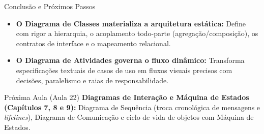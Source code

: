 \documentclass[10pt]{beamer}
\begin{document}
\begin{frame}{Conclusão e Próximos Passos}
    \begin{itemize}
        \item \textbf{O Diagrama de Classes materializa a arquitetura estática:} Define com rigor a hierarquia, o acoplamento todo-parte (agregação/composição), os contratos de interface e o mapeamento relacional.
        \item \textbf{O Diagrama de Atividades governa o fluxo dinâmico:} Transforma especificações textuais de casos de uso em fluxos visuais precisos com decisões, paralelismo e raias de responsabilidade.
    \end{itemize}
    \vspace{0.3cm}
    \begin{exampleblock}{Próxima Aula (Aula 22)}
        \textbf{Diagramas de Interação e Máquina de Estados (Capítulos 7, 8 e 9):}
        Diagrama de Sequência (troca cronológica de mensagens e \textit{lifelines}), Diagrama de Comunicação e ciclo de vida de objetos com Máquina de Estados.
    \end{exampleblock}
\end{frame}
\end{document}
